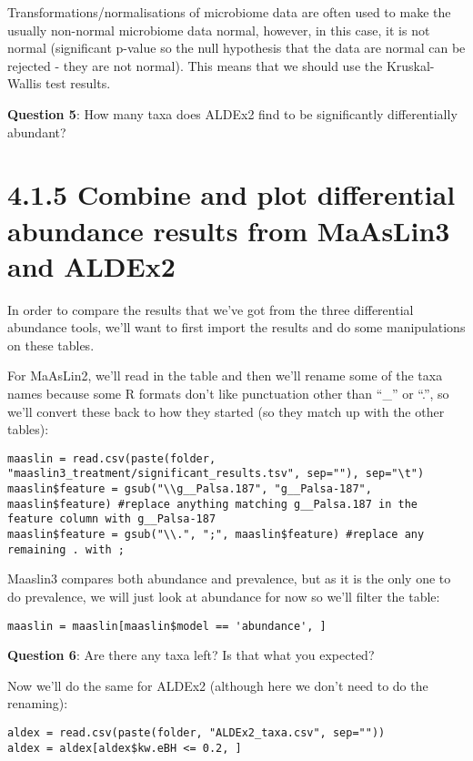 \documentclass[
]{book}
\begin{document}
Transformations/normalisations of microbiome data are often used to make the usually non-normal microbiome data normal, however, in this case, it is not normal (significant p-value so the null hypothesis that the data are normal can be rejected - they are not normal). This means that we should use the Kruskal-Wallis test results.

\textbf{Question 5}: How many taxa does ALDEx2 find to be significantly differentially abundant?

\section{4.1.5 Combine and plot differential abundance results from MaAsLin3 and ALDEx2}\label{combine-and-plot-differential-abundance-results-from-maaslin3-and-aldex2}

In order to compare the results that we've got from the three differential abundance tools, we'll want to first import the results and do some manipulations on these tables.

For MaAsLin2, we'll read in the table and then we'll rename some of the taxa names because some R formats don't like punctuation other than ``\_'' or ``.'', so we'll convert these back to how they started (so they match up with the other tables):

\begin{verbatim}
maaslin = read.csv(paste(folder, "maaslin3_treatment/significant_results.tsv", sep=""), sep="\t")
maaslin$feature = gsub("\\g__Palsa.187", "g__Palsa-187", maaslin$feature) #replace anything matching g__Palsa.187 in the feature column with g__Palsa-187
maaslin$feature = gsub("\\.", ";", maaslin$feature) #replace any remaining . with ;
\end{verbatim}

Maaslin3 compares both abundance and prevalence, but as it is the only one to do prevalence, we will just look at abundance for now so we'll filter the table:

\begin{verbatim}
maaslin = maaslin[maaslin$model == 'abundance', ]
\end{verbatim}

\textbf{Question 6}: Are there any taxa left? Is that what you expected?

Now we'll do the same for ALDEx2 (although here we don't need to do the renaming):

\begin{verbatim}
aldex = read.csv(paste(folder, "ALDEx2_taxa.csv", sep=""))
aldex = aldex[aldex$kw.eBH <= 0.2, ]
\end{verbatim}
\end{document}
